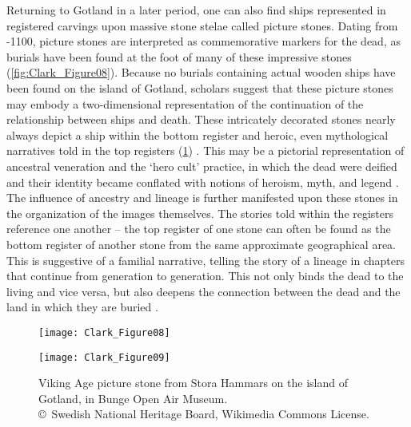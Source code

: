 Returning to Gotland in a later period, one can also find ships represented in registered carvings upon massive stone stelae called picture stones. Dating from -1100, picture stones are interpreted as commemorative markers for the dead, as burials have been found at the foot of many of these impressive stones (\cref{fig:Clark_Figure08}). Because no burials containing actual wooden ships have been found on the island of Gotland, scholars suggest that these picture stones may embody a two-dimensional representation of the continuation of the relationship between ships and death. These intricately decorated stones nearly always depict a ship within the bottom register and heroic, even mythological narratives told in the top registers (\cref{fig:Clark_Figure09})
\parencite[396--398]{Skoglund_2008}.
This may be a pictorial representation of ancestral veneration and the ‘hero cult’ practice, in which the dead were deified and their identity became conflated with notions of heroism, myth, and legend \parencite[177]{Sundqvist_2015}.
The influence of ancestry and lineage is further manifested upon these stones in the organization of the images themselves. The stories told within the registers reference one another – the top register of one stone can often be found as the bottom register of another stone from the same approximate geographical area. This is suggestive of a familial narrative, telling the story of a lineage in chapters that continue from generation to generation. This not only binds the dead to the living and vice versa, but also deepens the connection between the dead and the land in which they are buried \parencite{Price_2012a}.

\begin{figure}[!tb]
\begin{minipage}[t]{.49\linewidth}
	\texttt{[image: Clark\_Figure08]}
	\caption{"The Hunninge stone": Picture Stone nº1 from Hunninge, Gotland. 8th century A.D. The Gotland Museum (Visby).
		{\normalfont\scriptsize \\ \copyright\ Swedish National Heritage Board, Wikimedia Commons License.
	}}
	\label{fig:Clark_Figure08}
\end{minipage}
\hfill
\begin{minipage}[t]{.49\linewidth}
	\texttt{[image: Clark\_Figure09]}
	\caption{Viking Age picture stone from Stora Hammars on the island of Gotland, in Bunge Open Air Museum.
		{\normalfont\scriptsize \\ \copyright\ Swedish National Heritage Board, Wikimedia Commons License.
	}}
	\label{fig:Clark_Figure09}
\end{minipage}
\end{figure}

